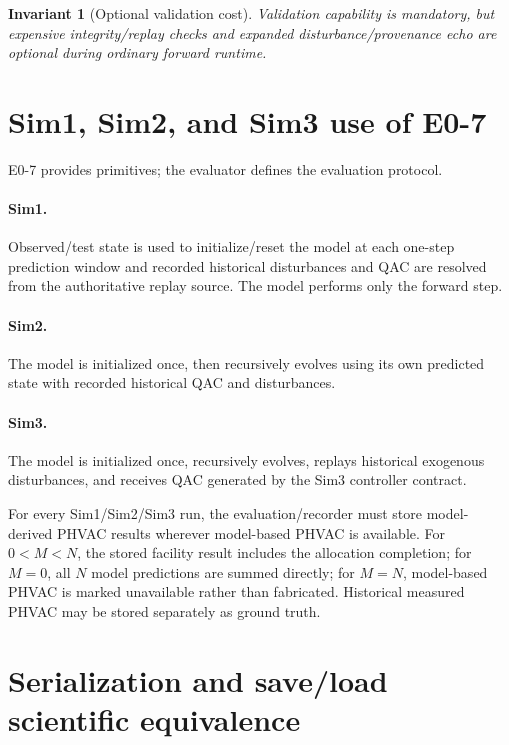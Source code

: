 \documentclass[11pt]{article}
\newtheorem{invariant}{Invariant}
\begin{document}
\begin{invariant}[Optional validation cost]
Validation capability is mandatory, but expensive integrity/replay checks and
expanded disturbance/provenance echo are optional during ordinary forward
runtime.
\end{invariant}

\section{Sim1, Sim2, and Sim3 use of E0-7}

E0-7 provides primitives; the evaluator defines the evaluation protocol.

\paragraph{Sim1.}
Observed/test state is used to initialize/reset the model at each one-step
prediction window and recorded historical disturbances and QAC are resolved from
the authoritative replay source. The model performs only the forward step.

\paragraph{Sim2.}
The model is initialized once, then recursively evolves using its own predicted
state with recorded historical QAC and disturbances.

\paragraph{Sim3.}
The model is initialized once, recursively evolves, replays historical exogenous
disturbances, and receives QAC generated by the Sim3 controller contract.

For every Sim1/Sim2/Sim3 run, the evaluation/recorder must store model-derived
PHVAC results wherever model-based PHVAC is available. For $0<M<N$, the stored
facility result includes the allocation completion; for $M=0$, all $N$ model
predictions are summed directly; for $M=N$, model-based PHVAC is marked
unavailable rather than fabricated. Historical measured PHVAC may be
stored separately as ground truth.

\section{Serialization and save/load scientific equivalence}
\end{document}
